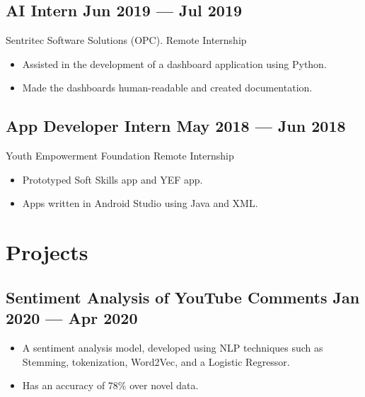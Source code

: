 \documentclass[a4,10pt]{article}
\newcommand{\subtext}[1]{
#1\par\vspace{-0.2cm}}
\newenvironment{zitemize}{
\begin{itemize}\itemsep0pt \parskip0pt \parsep1pt}
{\end{itemize}\vspace{-0.5cm}}
\begin{document}
\subsection*{AI Intern \hfill Jun 2019 --- Jul 2019} 
\subtext{Sentritec Software Solutions (OPC). \hfill Remote Internship} 
    \begin{zitemize}
        \item Assisted in the development of a dashboard application using Python.
        \item Made the dashboards human-readable and created documentation.
    \end{zitemize}

\subsection*{App Developer Intern  \hfill May 2018 --- Jun 2018} 
\subtext{Youth Empowerment Foundation \hfill Remote Internship} 
    \begin{zitemize}
        \item Prototyped Soft Skills app and YEF app.
        \item Apps written in Android Studio using Java and XML.
    \end{zitemize}



\section{Projects} %


\subsection*{Sentiment Analysis of YouTube Comments \hfill Jan 2020 --- Apr 2020} 
    \begin{zitemize}
        \item A sentiment analysis model, developed using NLP techniques such as Stemming, tokenization, Word2Vec, and a Logistic Regressor.
        \item Has an accuracy of 78\% over novel data.
    \end{zitemize}
\end{document}

